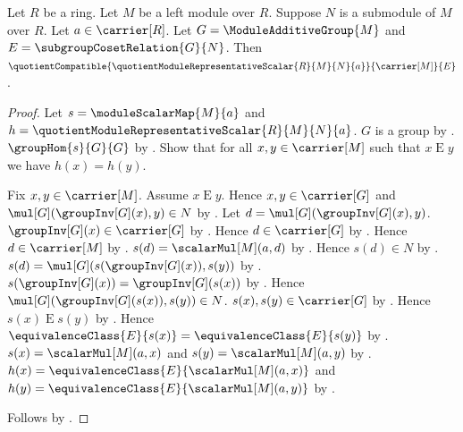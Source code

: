 \begin{proposition}\label{quotient_module_representative_scalar_compatible}
    Let $R$ be a ring.
    Let $M$ be a left module over $R$.
    Suppose $N$ is a submodule of $M$ over $R$.
    Let $a\in\carrier[R]$.
    Let $G=\ModuleAdditiveGroup{M}$ and
        $E=\subgroupCosetRelation{G}{N}$.
    Then
        $\quotientCompatible{
            \quotientModuleRepresentativeScalar{R}{M}{N}{a}}
            {\carrier[M]}{E}$.
\end{proposition}
\begin{proof}
    Let $s=\moduleScalarMap{M}{a}$ and
        $h=\quotientModuleRepresentativeScalar{R}{M}{N}{a}$.
    $G$ is a group by .
    $\groupHom{s}{G}{G}$ by .
    Show that for all $x,y\in\carrier[M]$ such that $x\mathrel{E}y$
        we have $h(x)=h(y)$.
    \begin{subproof}
        Fix $x,y\in\carrier[M]$.
        Assume $x\mathrel{E}y$.
        Hence $x,y\in\carrier[G]$ and
            $\mul[G](\groupInv[G](x),y)\in N$ by
            .
        Let $d=\mul[G](\groupInv[G](x),y)$.
        $\groupInv[G](x)\in\carrier[G]$ by
            .
        Hence $d\in\carrier[G]$ by
            .
        Hence $d\in\carrier[M]$ by
            .
        $s(d)=\scalarMul[M](a,d)$ by
            .
        Hence $s(d)\in N$ by .
        $s(d)=\mul[G](s(\groupInv[G](x)),s(y))$ by
            .
        $s(\groupInv[G](x))=\groupInv[G](s(x))$ by
            .
        Hence $\mul[G](\groupInv[G](s(x)),s(y))\in N$.
        $s(x),s(y)\in\carrier[G]$ by
            .
        Hence $s(x)\mathrel{E}s(y)$ by
            .
        Hence
            $\equivalenceClass{E}{s(x)}
                =\equivalenceClass{E}{s(y)}$ by
            .
        $s(x)=\scalarMul[M](a,x)$ and
            $s(y)=\scalarMul[M](a,y)$ by
            .
        $h(x)=\equivalenceClass{E}{\scalarMul[M](a,x)}$ and
            $h(y)=\equivalenceClass{E}{\scalarMul[M](a,y)}$ by
            .
    \end{subproof}
    Follows by .
\end{proof}

